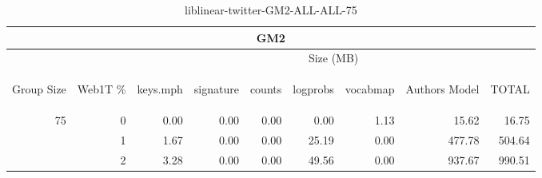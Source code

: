\begin{center}
\begin{table}[htbp] 
 \begin{center}
\begin{tabular}{ | r | r | r | r | r | r | r | r | r |}
\hline
\multicolumn{9}{|c|}{GM2}\\
\hline
 & & \multicolumn{7}{|c|}{Size (MB)}\\ \cline{3-9}
\begin{sideways}Group Size\end{sideways} & \begin{sideways}Web1T \% \end{sideways} & \begin{sideways}keys.mph\end{sideways} & \begin{sideways}signature\end{sideways} & \begin{sideways}counts\end{sideways} & \begin{sideways}logprobs\end{sideways} & \begin{sideways}vocabmap\end{sideways} & \begin{sideways}Authors Model \end{sideways} & \begin{sideways}TOTAL\end{sideways}\\
\hline
\multirow{2}{*}{75}
 & 0 & 0.00 & 0.00 & 0.00 & 0.00 & 1.13 & 15.62 & 16.75\\ \cline{2-9}
 & 1 & 1.67 & 0.00 & 0.00 & 25.19 & 0.00 & 477.78 & 504.64\\ \cline{2-9}
 & 2 & 3.28 & 0.00 & 0.00 & 49.56 & 0.00 & 937.67 & 990.51\\ \cline{2-9}
\hline
\end{tabular}
\caption{liblinear-twitter-GM2-ALL-ALL-75}
\label{table:liblinear-twitter-GM2-ALL-ALL-75}
\end{center}
 \end{table}
\end{center}

